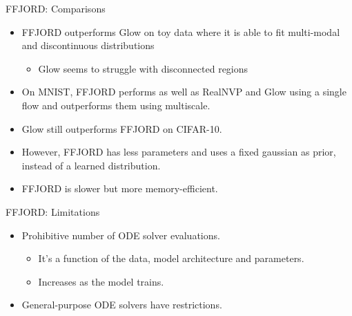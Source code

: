 \begin{frame}{FFJORD: Comparisons}
    \begin{itemize}
        \item FFJORD outperforms Glow on toy data where it is able to fit multi-modal and discontinuous distributions
            \begin{itemize}
                \item Glow seems to struggle with disconnected regions
            \end{itemize}
        \item On MNIST, FFJORD performs as well as RealNVP and Glow using a single flow and outperforms them using multiscale.
        \item Glow still outperforms FFJORD on CIFAR-10.
            \item However, FFJORD has less parameters and uses a fixed gaussian as prior, instead of a learned distribution.
        \item FFJORD is slower but more memory-efficient.
    \end{itemize}
\end{frame}
\begin{frame}{FFJORD: Limitations}
    \begin{itemize}
        \item Prohibitive number of ODE solver evaluations.
        \begin{itemize}
            \item It's a function of the data, model architecture and parameters.
            \item Increases as the model trains.
        \end{itemize}
        \item General-purpose ODE solvers have restrictions.
    \end{itemize}
\end{frame}
